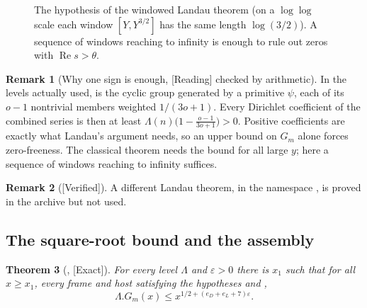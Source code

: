 \documentclass[11pt]{article}
\newcommand{\Exact}{\textcolor{exactc}{\textsf{\small[Exact]}}}
\newcommand{\Verified}{\textcolor{verc}{\textsf{\small[Verified]}}}
\newcommand{\Reading}{\textcolor{readc}{\textsf{\small[Reading]}}}
\newcommand{\eps}{\varepsilon}
\newcommand{\re}{\operatorname{Re}}
\theoremstyle{plain}
\newtheorem{theorem}{Theorem}[section]
\theoremstyle{definition}
\newtheorem{remark}[theorem]{Remark}
\begin{document}
\begin{figure}[ht]
\centering
{}
\caption{The hypothesis of the windowed Landau theorem (on a $\log\log$ scale each window $[Y,Y^{3/2}]$
has the same length $\log(3/2)$). A sequence of windows reaching to infinity is enough to rule out zeros
with $\re s>\theta$.}\label{fig:windows}
\end{figure}

\begin{remark}[Why one sign is enough, \Reading{} checked by arithmetic]
In the levels actually used,  is the cyclic group generated by a primitive
$\psi$, each of its $o-1$ nontrivial members weighted $1/(3o+1)$. Every Dirichlet coefficient of the
combined series is then at least $\Lambda(n)\bigl(1-\tfrac{o-1}{3o+1}\bigr)>0$. Positive
coefficients are exactly what Landau's argument needs, so an upper bound on $G_m$ alone forces
zero-freeness. The classical theorem needs the bound for all large $y$; here a sequence of windows
reaching to infinity suffices.
\end{remark}

\begin{remark}[\Verified]
A different Landau theorem,  in the namespace
, is proved in the archive but not used.
\end{remark}

\subsection{The square-root bound and the assembly}

\begin{theorem}[, \Exact]\label{thm:coregm}
For every level $\Lambda$ and $\eps>0$ there is $x_1$ such that for all $x\ge x_1$, every frame and
host satisfying the hypotheses  and ,
\[
\Lambda.G_m(x)\le x^{1/2+(e_D+e_L+7)\eps}.
\]
\end{theorem}
\end{document}
